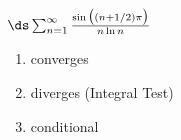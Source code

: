 {$\ds \sum_{n=1}^\infty \frac{\sin\big((n+1/2)\pi\big)}{n\ln n}$
}
{\begin{enumerate}
	\item converges
	\item	diverges (Integral Test)
	\item conditional
\end{enumerate}
}
